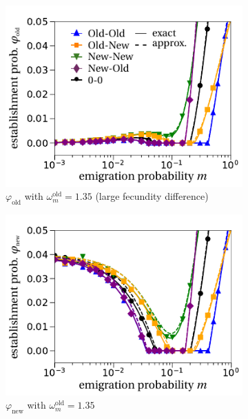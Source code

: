 \documentclass[a4paper,11pt]{article}
\begin{document}
\begin{figure}[t!]
	\centering
	\begin{subfigure}{.5\textwidth}
  		\centering
  		\includegraphics[width=\linewidth]{fig2a.pdf}
  		\caption{$\varphi_{\text{old}}$ with $\omega^\text{old}_m = 1.35$ (large fecundity difference)}
	\end{subfigure}%
	\begin{subfigure}{.5\textwidth}
 		 \centering
 		 \includegraphics[width=\linewidth]{fig2b.pdf}
  		\caption{$\varphi_{\text{new}}$ with $\omega^\text{old}_m = 1.35$}
	\end{subfigure}
	\begin{subfigure}{.5\textwidth}
  		\centering

\end{subfigure}
\end{figure}
\end{document}

